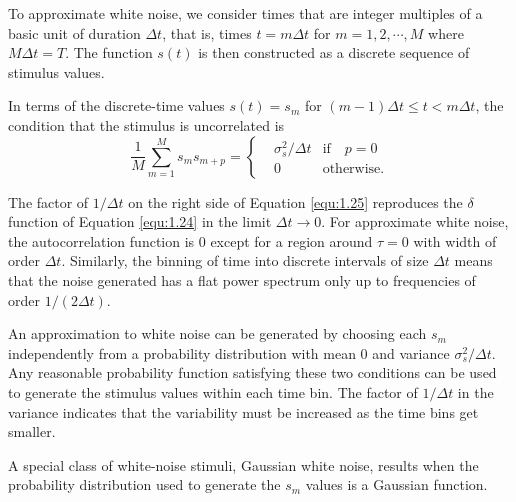 \begin{ntn}
  To approximate white noise, we consider times that are integer multiples of a basic unit of duration $\Delta{t}$, that is, times $t = m \Delta{t}$ for $m = 1, 2, \cdots, M$ where $M\Delta{t} = T$. The function $s(t)$ is then constructed as a discrete sequence of stimulus values.
\end{ntn}

\begin{prop}
  \label{prop:disc-uncor-conds}
  In terms of the discrete-time values $s(t) = s_m$ for $(m-1)\Delta t \leq t < m\Delta t$, the condition that the stimulus is uncorrelated is
  \begin{equation}
    \label{equ:1.25}
    \frac{1}{M} \sum_{m=1}^M s_ms_{m+p} = \left\{
      \begin{aligned}
        &\sigma_s^2/\Delta{t}  & \text{if} \quad p=0\ \\
        &0   &\text{otherwise}.
      \end{aligned}
    \right.
  \end{equation}  
\end{prop}

\begin{rem}
  The factor of $1/\Delta{t}$ on the right side of Equation \ref{equ:1.25} reproduces the $\delta$ function of Equation \ref{equ:1.24} in the limit $\Delta{t} \rightarrow 0$. For approximate white noise, the autocorrelation function is 0 except for a region around $\tau=0$ with width of order $\Delta{t}$. Similarly, the binning of time into discrete intervals of size $\Delta{t}$ means that the noise generated has a flat power spectrum only up to frequencies of order $1/(2\Delta{t})$.
\end{rem}

\begin{rem}
  \label{rem:whiteNoiseApprox}
  An approximation to white noise can be generated by choosing each $s_m$ independently from a probability distribution with mean $0$ and variance $\sigma_s^2 / \Delta{t}$. Any reasonable probability function satisfying these two conditions can be used to generate the stimulus values within each time bin. The factor of $1/\Delta{t}$ in the variance indicates that the variability must be increased as the time bins get smaller.
\end{rem}

\begin{exm}
  \label{exm:whiteNoiseApproxExm}
  A special class of white-noise stimuli, Gaussian white noise, results when the probability distribution used to generate the $s_m$ values is a Gaussian function.
\end{exm}


